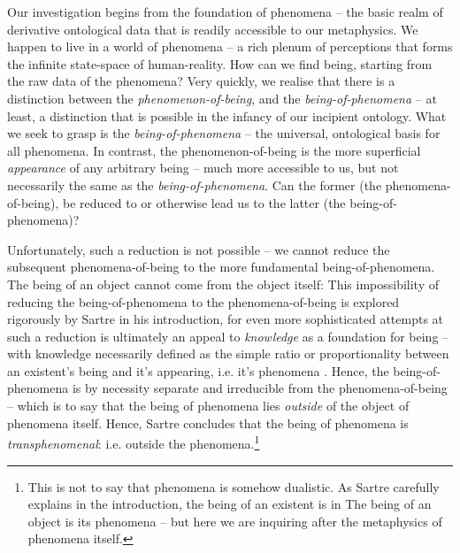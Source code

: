 Our investigation begins from the foundation of phenomena -- the basic realm of derivative ontological data that is readily accessible to our metaphysics. We happen to live in a world of phenomena -- a rich plenum of perceptions that forms the infinite state-space of human-reality. How can we find being, starting from the raw data of the phenomena? Very quickly, we realise that there is a distinction between the \emph{phenomenon-of-being}, and the \emph{being-of-phenomena} -- at least, a distinction that is possible in the infancy of our incipient ontology. What we seek to grasp is the \emph{being-of-phenomena} -- the universal, ontological basis for all phenomena. In contrast, the phenomenon-of-being is the more superficial \emph{appearance} of any arbitrary being -- much more accessible to us, but not necessarily the same as the \emph{being-of-phenomena}.  Can the former (the phenomena-of-being), be reduced to or otherwise lead us to the latter (the being-of-phenomena)? 

Unfortunately, such a reduction is not possible -- we cannot reduce the subsequent phenomena-of-being to the more fundamental being-of-phenomena. The being of an object cannot come from the object itself:  This impossibility of reducing the being-of-phenomena to the phenomena-of-being is explored rigorously by Sartre in his introduction, for even more sophisticated attempts at such a reduction is ultimately an appeal to \emph{knowledge} as a foundation for being -- with knowledge necessarily defined as the simple ratio or proportionality between an existent's being and it's appearing, i.e. it's phenomena \autocite[7]{Sartre}. Hence, the being-of-phenomena is by necessity separate and irreducible from the phenomena-of-being -- which is to say that the being of phenomena lies \emph{outside} of the object of phenomena itself.  Hence, Sartre concludes that the being of phenomena is \emph{transphenomenal}: i.e. outside the phenomena.\footnote{This is not to say that phenomena is somehow dualistic. As Sartre carefully explains in the introduction, the being of an existent is in  The being of an object is its phenomena -- but here we are inquiring after the metaphysics of phenomena itself.}


